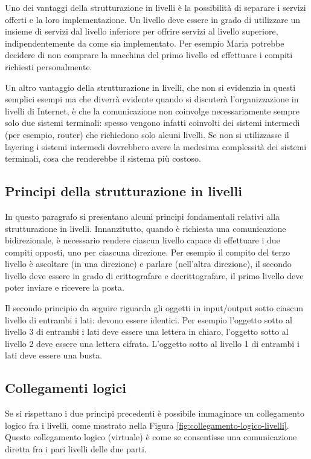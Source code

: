Uno dei vantaggi della strutturazione in livelli è la possibilità di separare i servizi offerti e la loro implementazione. Un livello deve essere in grado di utilizzare un insieme di servizi dal livello inferiore per offrire servizi al livello superiore, indipendentemente da come sia implementato. Per esempio Maria potrebbe decidere di non comprare la macchina del primo livello ed effettuare i compiti richiesti personalmente.

Un altro vantaggio della strutturazione in livelli, che non si evidenzia in questi semplici esempi ma che diverrà evidente quando si discuterà l'organizzazione in livelli di Internet, è che la comunicazione non coinvolge necessariamente sempre solo due sistemi terminali: spesso vengono infatti coinvolti dei sistemi intermedi (per esempio, router) che richiedono solo alcuni livelli. Se non si utilizzasse il layering i sistemi intermedi dovrebbero avere la medesima complessità dei sistemi terminali, cosa che renderebbe il sistema più costoso.

\subsection{Principi della strutturazione in livelli}

In questo paragrafo si presentano alcuni principi fondamentali relativi alla strutturazione in livelli. Innanzitutto, quando è richiesta una comunicazione bidirezionale, è necessario rendere ciascun livello capace di effettuare i due compiti opposti, uno per ciascuna direzione. Per esempio il compito del terzo livello è ascoltare (in una direzione) e parlare (nell'altra direzione), il secondo livello deve essere in grado di crittografare e decrittografare, il primo livello deve poter inviare e ricevere la posta.

Il secondo principio da seguire riguarda gli oggetti in input/output sotto ciascun livello di entrambi i lati: devono essere identici. Per esempio l'oggetto sotto al livello 3 di entrambi i lati deve essere una lettera in chiaro, l'oggetto sotto al livello 2 deve essere una lettera cifrata. L'oggetto sotto al livello 1 di entrambi i lati deve essere una busta.

\subsection{Collegamenti logici}
Se si rispettano i due principi precedenti è possibile immaginare un collegamento logico fra i livelli, come mostrato nella Figura \ref{fig:collegamento-logico-livelli}.
Questo collegamento logico (virtuale) è come se consentisse una comunicazione diretta fra i pari livelli delle due parti.

